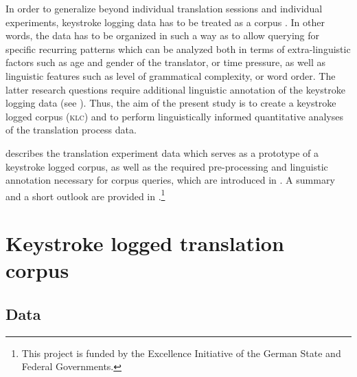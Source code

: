\documentclass[output=paper]{LSP/langsci}
\begin{document}
In order to generalize beyond individual translation sessions and individual experiments, keystroke logging data has to be treated as a corpus \citep{Alves2004, Alves2009, Alves2011}. In other words, the data has to be organized in such a way as to allow querying for specific recurring patterns \citep{Carl2009} which can be analyzed both in terms of extra-linguistic factors such as age and gender of the translator, or time pressure, as well as linguistic features such as level of grammatical complexity, or word order. The latter research questions require additional linguistic annotation of the keystroke logging data (see ). Thus, the aim of the present study is to create a keystroke logged corpus (\textsc{klc}) and to perform linguistically informed quantitative analyses of the translation process data.

 describes the translation experiment data which serves as a prototype of a keystroke logged corpus, as well as the required pre-processing and linguistic annotation necessary for corpus queries, which are introduced in . A summary and a short outlook are provided in .\footnote{This project is funded by the Excellence Initiative of the German State and Federal Governments.} 

\section{Keystroke logged translation corpus} \label{sec:1:2}
\subsection{Data} \label{sec:1:2:1}
\end{document}
